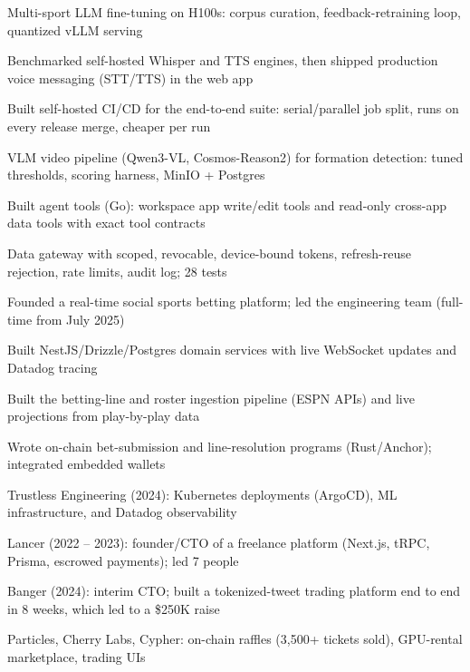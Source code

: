 \documentclass[print]{jack-resume}
\begin{document}
\begin{tightemize}
    \item Multi-sport LLM fine-tuning on H100s: corpus curation, feedback-retraining loop, quantized vLLM serving
    \item Benchmarked self-hosted Whisper and TTS engines, then shipped production voice messaging (STT/TTS) in the web app
    \item Built self-hosted CI/CD for the end-to-end suite: serial/parallel job split, runs on every release merge, cheaper per run
    \item VLM video pipeline (Qwen3-VL, Cosmos-Reason2) for formation detection: tuned thresholds, scoring harness, MinIO + Postgres
    \item Built agent tools (Go): workspace app write/edit tools and read-only cross-app data tools with exact tool contracts
    \item Data gateway with scoped, revocable, device-bound tokens, refresh-reuse rejection, rate limits, audit log; 28 tests
\end{tightemize}
\sectionsep

\begin{tightemize}
    \item Founded a real-time social sports betting platform; led the engineering team (full-time from July 2025)
    \item Built NestJS/Drizzle/Postgres domain services with live WebSocket updates and Datadog tracing
    \item Built the betting-line and roster ingestion pipeline (ESPN APIs) and live projections from play-by-play data
    \item Wrote on-chain bet-submission and line-resolution programs (Rust/Anchor); integrated embedded wallets
\end{tightemize}
\sectionsep

\begin{tightemize}
    \item Trustless Engineering (2024): Kubernetes deployments (ArgoCD), ML infrastructure, and Datadog observability
    \item Lancer (2022 – 2023): founder/CTO of a freelance platform (Next.js, tRPC, Prisma, escrowed payments); led 7 people
    \item Banger (2024): interim CTO; built a tokenized-tweet trading platform end to end in 8 weeks, which led to a \$250K raise
    \item Particles, Cherry Labs, Cypher: on-chain raffles (3,500+ tickets sold), GPU-rental marketplace, trading UIs
\end{tightemize}
\sectionsep
\end{document}
